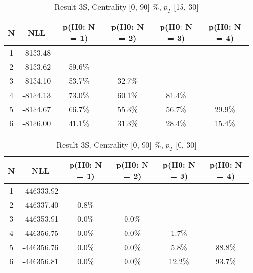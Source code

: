\begin{table}[htb]
	\begin{center}
	\caption{Result 3S, Centrality [0, 90] \%, $p_{T}$ [15, 30] \GeV
}
{\footnotesize\renewcommand{\arraystretch}{1.4}
		\begin{tabular}{cc||>{\columncolor[gray]{0.8}}cccc}
			N & NLL & p(H0: N = 1) & p(H0: N = 2) & p(H0: N = 3) & p(H0: N = 4)\\ 
		\hline
1 & -8133.48 & & & & \\
2 & -8133.62 & 59.6\% & & & \\
3 & -8134.10 & 53.7\% & 32.7\% & & \\
4 & -8134.13 & 73.0\% & 60.1\% & 81.4\% & \\
5 & -8134.67 & 66.7\% & 55.3\% & 56.7\% & 29.9\% \\
6 & -8136.00 & 41.1\% & 31.3\% & 28.4\% & 15.4\% \\
	\end{tabular}
		\label{tab:lab}
	}
	\end{center}\end{table}

\begin{table}[htb]
	\begin{center}
	\caption{Result 3S, Centrality [0, 90] \%, $p_{T}$ [0, 30] \GeV
}
{\footnotesize\renewcommand{\arraystretch}{1.4}
		\begin{tabular}{cc||ccc>{\columncolor[gray]{0.8}}c}
			N & NLL & p(H0: N = 1) & p(H0: N = 2) & p(H0: N = 3) & p(H0: N = 4)\\ 
		\hline
1 & -446333.92 & & & & \\
2 & -446337.40 & 0.8\% & & & \\
3 & -446353.91 & 0.0\% & 0.0\% & & \\
4 & -446356.75 & 0.0\% & 0.0\% & 1.7\% & \\
5 & -446356.76 & 0.0\% & 0.0\% & 5.8\% & 88.8\% \\
6 & -446356.81 & 0.0\% & 0.0\% & 12.2\% & 93.7\% \\
	\end{tabular}
		\label{tab:lab}
	}
	\end{center}\end{table}

